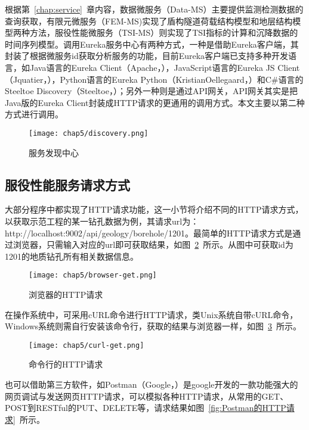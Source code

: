 根据第~\ref{chap:service}~章内容，数据微服务（Data-MS）主要提供监测检测数据的查询获取，有限元微服务（FEM-MS)实现了盾构隧道荷载结构模型和地层结构模型两种方法，服役性能微服务（TSI-MS）则实现了TSI指标的计算和沉降数据的时间序列模型。调用Eureka服务中心有两种方式，一种是借助Eureka客户端，其封装了根据微服务id获取分析服务的功能，目前Eureka客户端已支持多种开发语言，如Java语言的Eureka Client（Apache，\citeyear{eurekaclient2018}），JavaScript语言的Eureka JS Client（Jquatier，\citeyear{eurekajsclient2018}），Python语言的Eureka Python（KristianOellegaard，\citeyear{pythoneureka2018}）和C\#语言的Steeltoe Discovery（Steeltoe，\citeyear{steeltoe2018}）；另外一种则是通过API网关，API网关其实是把Java版的Eureka Client封装成HTTP请求的更通用的调用方式。本文主要以第二种方式进行调用。

\begin{figure}[htb!]
    \centering
    \texttt{[image: chap5/discovery.png]}
    \caption{服务发现中心}
    \label{fig:服务发现中心}
\end{figure}

\subsection{服役性能服务请求方式}
\label{chap:http-request-way}

大部分程序中都实现了HTTP请求功能，这一小节将介绍不同的HTTP请求方式，以获取示范工程的某一钻孔数据为例，其请求url为：http://localhost:9002/api/geology/borehole/1201。最简单的HTTP请求方式是通过浏览器，只需输入对应的url即可获取结果，如图~\ref{fig:浏览器的HTTP请求}~所示。从图中可获取id为1201的地质钻孔所有相关数据信息。

\begin{figure}[htb!]
    \centering
    \texttt{[image: chap5/browser-get.png]}
    \caption{浏览器的HTTP请求}
    \label{fig:浏览器的HTTP请求}
\end{figure}

在操作系统中，可采用cURL命令进行HTTP请求，类Unix系统自带cURL命令，Windows系统则需自行安装该命令行，获取的结果与浏览器一样，如图~\ref{fig:命令行的HTTP请求}~所示。

\begin{figure}[htb!]
    \centering
    \texttt{[image: chap5/curl-get.png]}
    \caption{命令行的HTTP请求}
    \label{fig:命令行的HTTP请求}
\end{figure}

也可以借助第三方软件，如Postman（Google，\citeyear{postman2018}）是google开发的一款功能强大的网页调试与发送网页HTTP请求，可以模拟各种HTTP请求，从常用的GET、POST到RESTful的PUT、DELETE等，请求结果如图~\ref{fig:Postman的HTTP请求}~所示。

